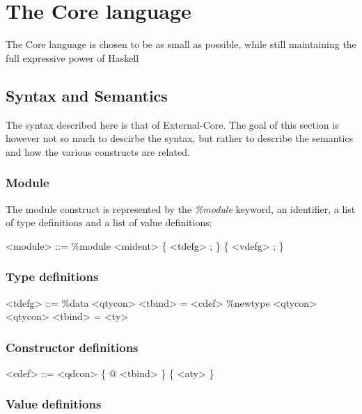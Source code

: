 



\chapter{The Core language}

The Core language is chosen to be as small as possible, while still maintaining 
the full expressive power of Haskell

\section*{Syntax and Semantics}

The syntax described here is that of External-Core. The goal of this section is
however not so much to descirbe the syntax, but rather to describe the semantics and 
how the various constructs are related.

\subsection*{Module}

The module construct is represented by the \emph{\%module} keyword, an identifier,
a list of type definitions and a list of value definitions:

\begin{grammar}
<module> ::= \%module <mident> \{ <tdefg> ; \} \{ <vdefg> ; \}
\end{grammar}

\subsection*{Type definitions}

\begin{grammar}
<tdefg> ::= \%data <qtycon> <tbind> = <cdef>
       \alt \%newtype <qtycon> <qtycon> <tbind> = <ty>
\end{grammar}


\subsection*{Constructor definitions}

\begin{grammar}
<cdef> ::= <qdcon> \{ @ <tbind> \} \{ <aty> \}
\end{grammar}

\subsection*{Value definitions}

